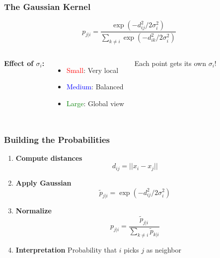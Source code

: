 \documentclass[aspectratio=169]{beamer}
\begin{document}
\begin{frame}
\frametitle{The Gaussian Kernel}

\begin{center}
$$p_{j|i} = \frac{\exp(-d_{ij}^2 / 2\sigma_i^2)}{\sum_{k \neq i} \exp(-d_{ik}^2 / 2\sigma_i^2)}$$
\end{center}

\begin{columns}
\centering
{}

\textbf{Effect of $\sigma_i$:}
\begin{itemize}
\item \textcolor{red}{Small}: Very local
\item \textcolor{blue}{Medium}: Balanced
\item \textcolor{green}{Large}: Global view
\end{itemize}

Each point gets its own $\sigma_i$!
\end{columns}

\end{frame}

\begin{frame}
\frametitle{Building the Probabilities}

\begin{enumerate}
\item \textbf{Compute distances}
$$d_{ij} = ||x_i - x_j||$$

\item \textbf{Apply Gaussian}
$$\tilde{p}_{j|i} = \exp(-d_{ij}^2 / 2\sigma_i^2)$$

\item \textbf{Normalize}
$$p_{j|i} = \frac{\tilde{p}_{j|i}}{\sum_{k \neq i} \tilde{p}_{k|i}}$$

\item \textbf{Interpretation}
\colorbox{yellow!20}{Probability that $i$ picks $j$ as neighbor}
\end{enumerate}

\end{frame}
\end{document}
